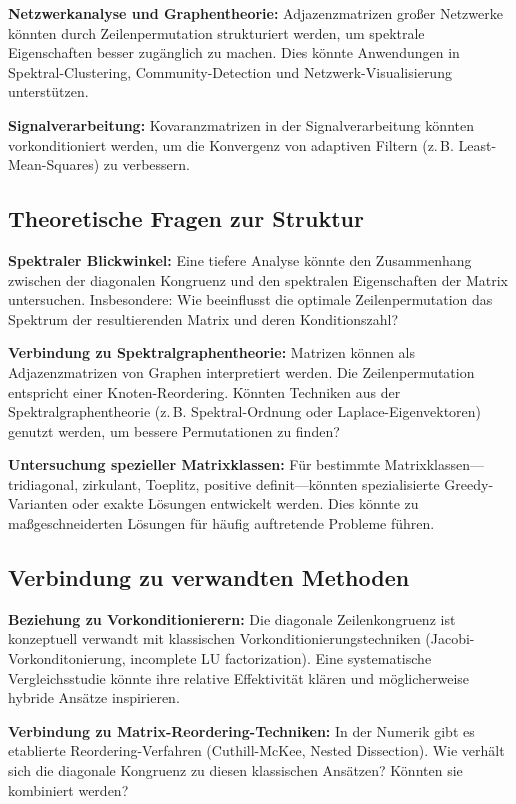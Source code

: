 \documentclass[a4paper,12pt]{article}
\theoremstyle{definition}
\begin{document}
\textbf{Netzwerkanalyse und Graphentheorie:} Adjazenzmatrizen großer Netzwerke könnten durch Zeilenpermutation strukturiert werden, um spektrale Eigenschaften besser zugänglich zu machen. Dies könnte Anwendungen in Spektral-Clustering, Community-Detection und Netzwerk-Visualisierung unterstützen.

\textbf{Signalverarbeitung:} Kovaranzmatrizen in der Signalverarbeitung könnten vorkonditioniert werden, um die Konvergenz von adaptiven Filtern (z.\,B. Least-Mean-Squares) zu verbessern.

\subsection*{Theoretische Fragen zur Struktur}

\textbf{Spektraler Blickwinkel:} Eine tiefere Analyse könnte den Zusammenhang zwischen der diagonalen Kongruenz und den spektralen Eigenschaften der Matrix untersuchen. Insbesondere: Wie beeinflusst die optimale Zeilenpermutation das Spektrum der resultierenden Matrix und deren Konditionszahl?

\textbf{Verbindung zu Spektralgraphentheorie:} Matrizen können als Adjazenzmatrizen von Graphen interpretiert werden. Die Zeilenpermutation entspricht einer Knoten-Reordering. Könnten Techniken aus der Spektralgraphentheorie (z.\,B. Spektral-Ordnung oder Laplace-Eigenvektoren) genutzt werden, um bessere Permutationen zu finden?

\textbf{Untersuchung spezieller Matrixklassen:} Für bestimmte Matrixklassen—tridiagonal, zirkulant, Toeplitz, positive definit—könnten spezialisierte Greedy-Varianten oder exakte Lösungen entwickelt werden. Dies könnte zu maßgeschneiderten Lösungen für häufig auftretende Probleme führen.

\subsection*{Verbindung zu verwandten Methoden}

\textbf{Beziehung zu Vorkonditionierern:} Die diagonale Zeilenkongruenz ist konzeptuell verwandt mit klassischen Vorkonditionierungstechniken (Jacobi-Vorkonditonierung, incomplete LU factorization). Eine systematische Vergleichsstudie könnte ihre relative Effektivität klären und möglicherweise hybride Ansätze inspirieren.

\textbf{Verbindung zu Matrix-Reordering-Techniken:} In der Numerik gibt es etablierte Reordering-Verfahren (Cuthill-McKee, Nested Dissection). Wie verhält sich die diagonale Kongruenz zu diesen klassischen Ansätzen? Könnten sie kombiniert werden?
\end{document}
